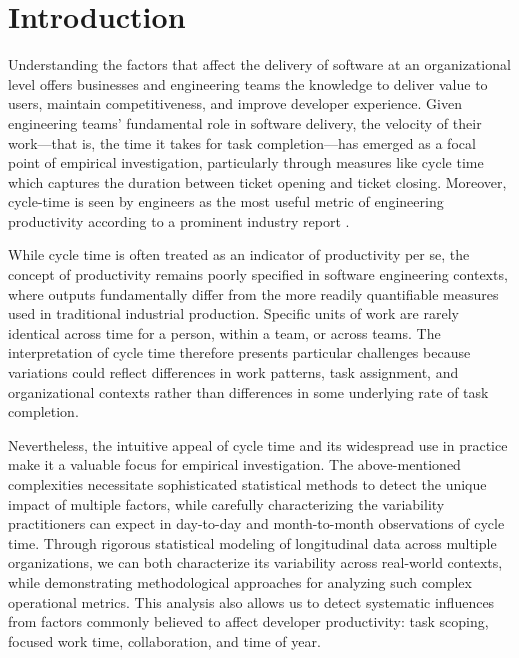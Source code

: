 \documentclass[manuscript,screen,review]{acmart}
\begin{document}
\maketitle

\setlength{\parskip}{-0.1pt}

\section{Introduction}\label{introduction}

Understanding the factors that affect the delivery of software at an
organizational level offers businesses and engineering teams the
knowledge to deliver value to users, maintain competitiveness, and
improve developer experience. Given engineering teams' fundamental role
in software delivery, the velocity of their work---that is, the time it
takes for task completion---has emerged as a focal point of empirical
investigation, particularly through measures like cycle time which
captures the duration between ticket opening and ticket closing.
Moreover, cycle-time is seen by engineers as the most useful metric of
engineering productivity according to a prominent industry report
\citep{careyWhy70Engineers2024}.

While cycle time is often treated as an indicator of productivity per
se, the concept of productivity remains poorly specified in software
engineering contexts, where outputs fundamentally differ from the more
readily quantifiable measures used in traditional industrial production.
Specific units of work are rarely identical across time for a person,
within a team, or across teams. The interpretation of cycle time
therefore presents particular challenges because variations could
reflect differences in work patterns, task assignment, and
organizational contexts rather than differences in some underlying rate
of task completion.

Nevertheless, the intuitive appeal of cycle time and its widespread use
in practice make it a valuable focus for empirical investigation. The
above-mentioned complexities necessitate sophisticated statistical
methods to detect the unique impact of multiple factors, while carefully
characterizing the variability practitioners can expect in day-to-day
and month-to-month observations of cycle time. Through rigorous
statistical modeling of longitudinal data across multiple organizations,
we can both characterize its variability across real-world contexts,
while demonstrating methodological approaches for analyzing such complex
operational metrics. This analysis also allows us to detect systematic
influences from factors commonly believed to affect developer
productivity: task scoping, focused work time, collaboration, and time
of year.
\end{document}
